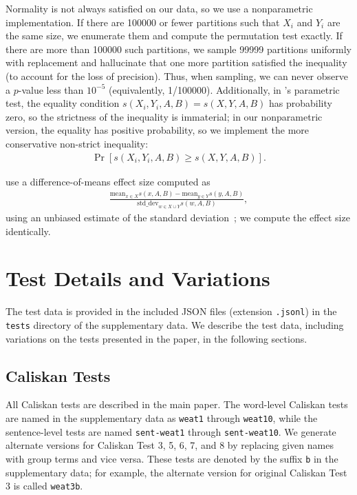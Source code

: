 \documentclass[11pt,a4paper]{article}
\newcommand{\mean}{\ensuremath{\mathrm{mean}}}
\newcommand{\stddev}{\ensuremath{\mathrm{std\_dev}}}
\begin{document}
Normality is not always satisfied on our data, so we use a nonparametric implementation.
If there are \num{100000} or fewer partitions such that $X_i$ and $Y_i$ are the same size, we enumerate them and compute the permutation test exactly.
If there are more than \num{100000} such partitions, we sample \num{99999} partitions uniformly with replacement and hallucinate that one more partition satisfied the inequality (to account for the loss of precision).  Thus, when sampling, we can never observe a $p$-value less than $10^{-5}$ (equivalently, \num{1}/\num{100000}).
Additionally, in \citet{caliskan2017semantics}'s parametric test, the equality condition $s(X_i, Y_i, A, B) = s(X, Y, A, B)$ has probability zero, so the strictness of the inequality is immaterial; in our nonparametric version, the equality has positive probability, so we implement the more conservative non-strict inequality:
\begin{align*}
\Pr \left[s(X_i, Y_i, A, B) \ge s(X, Y, A, B)\right].
\end{align*}

\citet{caliskan2017semantics} use a difference-of-means effect size computed as
\begin{align*}
\frac{
	\mean_{x \in X} s(x, A, B) - \mean_{y \in Y} s(y, A, B)
}{
	\stddev_{w \in X \cup Y} s(w, A, B)
},
\end{align*}
using an unbiased estimate of the standard deviation~\cite{caliskan2017replication}; we compute the effect size identically.

\section{Test Details and Variations}

The test data is provided in the included JSON files (extension \texttt{.jsonl}) in the \texttt{tests} directory of the supplementary data.  We describe the test data, including variations on the tests presented in the paper, in the following sections.

\subsection{Caliskan Tests}

All Caliskan tests are described in the main paper.  The word-level Caliskan tests are named in the supplementary data as \texttt{weat1} through \texttt{weat10}, while the sentence-level tests are named \texttt{sent-weat1} through \texttt{sent-weat10}.  We generate alternate versions for Caliskan Test 3, 5, 6, 7, and 8 by replacing given names with group terms and vice versa.  These tests are denoted by the suffix \texttt{b} in the supplementary data; for example, the alternate version for original Caliskan Test 3 is called \texttt{weat3b}.
\end{document}

